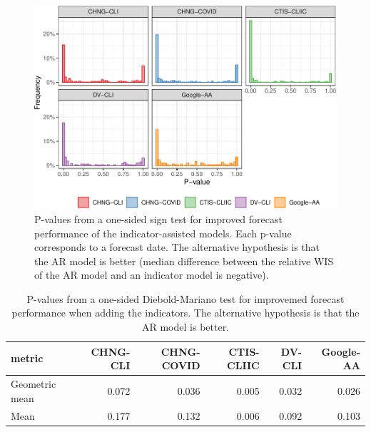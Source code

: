 \documentclass[9pt,twoside,lineno]{pnas-new}
\begin{document}
\begin{figure}

{\centering \includegraphics[width=\textwidth]{fig/sign-test-1} 

}

\caption{P-values from a one-sided sign test for improved forecast performance of the indicator-assisted models. Each p-value corresponds to a forecast date. The alternative hypothesis is that the AR model is better (median difference between the relative WIS of the AR model and an indicator model is negative).}\label{fig:sign-test}
\end{figure}

\begin{table}

\caption{\label{tab:dm-test}P-values from a one-sided Diebold-Mariano test for improvemed forecast performance when adding the indicators. The alternative hypothesis is that the AR model is better.}
\centering
\begin{tabular}[t]{lrrrrr}
\toprule
metric & CHNG-CLI & CHNG-COVID & CTIS-CLIIC & DV-CLI & Google-AA\\
\midrule
Geometric mean & 0.072 & 0.036 & 0.005 & 0.032 & 0.026\\
Mean & 0.177 & 0.132 & 0.006 & 0.092 & 0.103\\
\bottomrule
\end{tabular}
\end{table}
\end{document}
